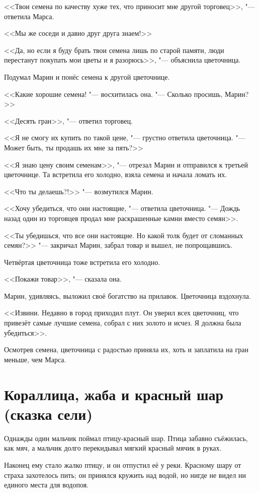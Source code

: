 \documentclass[a4paper,10pt]{book}
\begin{document}
<<Твои семена по качеству хуже тех, что приносит мне другой торговец>>, "--- 
ответила Марса.

<<Мы же соседи и давно друг друга знаем!>>

<<Да, но если я буду брать твои семена лишь по старой памяти, люди перестанут 
покупать мои цветы и я разорюсь>>, "--- объяснила цветочница.

Подумал Марин и понёс семена к другой цветочнице. 

<<Какие хорошие семена! "--- восхитилась она. "--- Сколько просишь, Марин?>>

<<Десять гран>>, "--- ответил торговец.

<<Я не смогу их купить по такой цене, "--- грустно ответила цветочница. "--- 
Может быть, ты продашь их мне за пять?>>

<<Я знаю цену своим семенам>>, "--- отрезал Марин и отправился к третьей 
цветочнице. Та встретила его холодно, взяла семена и начала ломать их.

<<Что ты делаешь?!>> "--- возмутился Марин.

<<Хочу убедиться, что они настоящие, "--- ответила цветочница. "--- Дождь назад
один из торговцев продал мне раскрашенные камни вместо семян>>.

<<Ты убедишься, что все они настоящие. Но какой толк будет от сломанных 
семян?>> 
"--- закричал Марин, забрал товар и вышел, не попрощавшись.

Четвёртая цветочница тоже встретила его холодно.

<<Покажи товар>>, "--- сказала она.

Марин, удивляясь, выложил своё богатство на прилавок. Цветочница вздохнула.

<<Извини. Недавно в город приходил плут. Он уверил всех цветочниц, что привезёт 
самые лучшие семена, собрал с них золото и исчез. Я должна была убедиться>>.

Осмотрев семена, цветочница с радостью приняла их, хоть и заплатила на гран 
меньше, чем Марса.

\section{Кораллица, жаба и красный шар (сказка сели)}

Однажды один мальчик поймал птицу-красный шар. Птица забавно съёжилась, как 
мяч, 
а мальчик долго перекидывал мягкий красный мячик в руках.

Наконец ему стало жалко птицу, и он отпустил её у реки. Красному шару от страха 
захотелось пить; он принялся кружить над водой, но нигде не видел ни единого 
места для водопоя.
\end{document}
